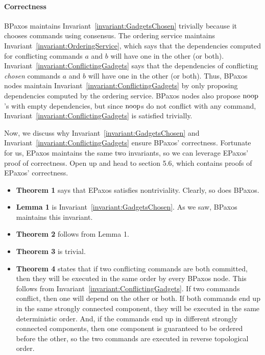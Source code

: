 \documentclass{mwhittaker}
\theoremstyle{definition}
\newcommand{\invref}[1]{Invariant~\ref{invariant:#1}}
\begin{document}
\paragraph{Correctness}
BPaxos maintains \invref{GadgetsChosen} trivially because it chooses commands
using consensus. The ordering service maintains \invref{OrderingService}, which
says that the dependencies computed for conflicting commands $a$ and $b$ will
have one in the other (or both). \invref{ConflictingGadgets} says that the
dependencies of conflicting \emph{chosen} commands $a$ and $b$ will have one in
the other (or both). Thus, BPaxos nodes maintain \invref{ConflictingGadgets} by
only proposing dependencies computed by the ordering service. BPaxos nodes also
propose $\text{noop}$'s with empty dependencies, but since $\text{noop}$s do not conflict
with any command, \invref{ConflictingGadgets} is satisfied trivially.

Now, we discuss why \invref{GadgetsChosen} and \invref{ConflictingGadgets}
ensure BPaxos' correctness. Fortunate for us, EPaxos maintains the same two
invariants, so we can leverage EPaxos' proof of correctness. Open up
\cite{moraru2013proof} and head to section 5.6, which contains proofs of
EPaxos' correctness.
\begin{itemize}
  \item
    \textbf{Theorem 1} says that EPaxos satisfies nontriviality. Clearly, so
    does BPaxos.

  \item
    \textbf{Lemma 1} is \invref{GadgetsChosen}. As we saw, BPaxos maintains
    this invariant.

  \item
    \textbf{Theorem 2} follows from Lemma 1.

  \item
    \textbf{Theorem 3} is trivial.

  \item
    \textbf{Theorem 4} states that if two conflicting commands are both
    committed, then they will be executed in the same order by every BPaxos
    node. This follows from \invref{ConflictingGadgets}. If two commands
    conflict, then one will depend on the other or both. If both commands end
    up in the same strongly connected component, they will be executed in the
    same deterministic order. And, if the commands end up in different strongly
    connected components, then one component is guaranteed to be ordered before
    the other, so the two commands are executed in reverse topological order.
\end{itemize}
\end{document}
